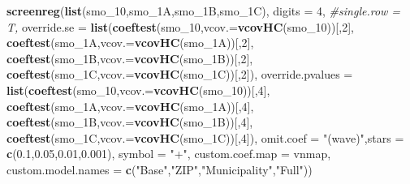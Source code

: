 \documentclass[
]{article}
\newenvironment{Shaded}{\begin{snugshade}}{\end{snugshade}}
\newcommand{\CommentTok}[1]{\textcolor[rgb]{0.56,0.35,0.01}{\textit{#1}}}
\newcommand{\DataTypeTok}[1]{\textcolor[rgb]{0.13,0.29,0.53}{#1}}
\newcommand{\DecValTok}[1]{\textcolor[rgb]{0.00,0.00,0.81}{#1}}
\newcommand{\FloatTok}[1]{\textcolor[rgb]{0.00,0.00,0.81}{#1}}
\newcommand{\KeywordTok}[1]{\textcolor[rgb]{0.13,0.29,0.53}{\textbf{#1}}}
\newcommand{\NormalTok}[1]{#1}
\newcommand{\StringTok}[1]{\textcolor[rgb]{0.31,0.60,0.02}{#1}}
\begin{document}
\begin{Shaded}
\begin{Highlighting}[]
\KeywordTok{screenreg}\NormalTok{(}\KeywordTok{list}\NormalTok{(smo_}\DecValTok{10}\NormalTok{,smo_1A,smo_1B,smo_1C), }\DataTypeTok{digits =} \DecValTok{4}\NormalTok{, }\CommentTok{#single.row = T,}
          \DataTypeTok{override.se =} \KeywordTok{list}\NormalTok{(}\KeywordTok{coeftest}\NormalTok{(smo_}\DecValTok{10}\NormalTok{,}\DataTypeTok{vcov.=}\KeywordTok{vcovHC}\NormalTok{(smo_}\DecValTok{10}\NormalTok{))[,}\DecValTok{2}\NormalTok{],}
                             \KeywordTok{coeftest}\NormalTok{(smo_1A,}\DataTypeTok{vcov.=}\KeywordTok{vcovHC}\NormalTok{(smo_1A))[,}\DecValTok{2}\NormalTok{],}
                             \KeywordTok{coeftest}\NormalTok{(smo_1B,}\DataTypeTok{vcov.=}\KeywordTok{vcovHC}\NormalTok{(smo_1B))[,}\DecValTok{2}\NormalTok{],}
                             \KeywordTok{coeftest}\NormalTok{(smo_1C,}\DataTypeTok{vcov.=}\KeywordTok{vcovHC}\NormalTok{(smo_1C))[,}\DecValTok{2}\NormalTok{]),}
          \DataTypeTok{override.pvalues =} \KeywordTok{list}\NormalTok{(}\KeywordTok{coeftest}\NormalTok{(smo_}\DecValTok{10}\NormalTok{,}\DataTypeTok{vcov.=}\KeywordTok{vcovHC}\NormalTok{(smo_}\DecValTok{10}\NormalTok{))[,}\DecValTok{4}\NormalTok{],}
                                  \KeywordTok{coeftest}\NormalTok{(smo_1A,}\DataTypeTok{vcov.=}\KeywordTok{vcovHC}\NormalTok{(smo_1A))[,}\DecValTok{4}\NormalTok{],}
                                  \KeywordTok{coeftest}\NormalTok{(smo_1B,}\DataTypeTok{vcov.=}\KeywordTok{vcovHC}\NormalTok{(smo_1B))[,}\DecValTok{4}\NormalTok{],}
                                  \KeywordTok{coeftest}\NormalTok{(smo_1C,}\DataTypeTok{vcov.=}\KeywordTok{vcovHC}\NormalTok{(smo_1C))[,}\DecValTok{4}\NormalTok{]),}
          \DataTypeTok{omit.coef =} \StringTok{"(wave)"}\NormalTok{,}\DataTypeTok{stars =} \KeywordTok{c}\NormalTok{(}\FloatTok{0.1}\NormalTok{,}\FloatTok{0.05}\NormalTok{,}\FloatTok{0.01}\NormalTok{,}\FloatTok{0.001}\NormalTok{), }\DataTypeTok{symbol =} \StringTok{"+"}\NormalTok{,}
          \DataTypeTok{custom.coef.map =}\NormalTok{ vnmap, }
          \DataTypeTok{custom.model.names =} \KeywordTok{c}\NormalTok{(}\StringTok{"Base"}\NormalTok{,}\StringTok{"ZIP"}\NormalTok{,}\StringTok{"Municipality"}\NormalTok{,}\StringTok{"Full"}\NormalTok{))}
\end{Highlighting}
\end{Shaded}
\end{document}
